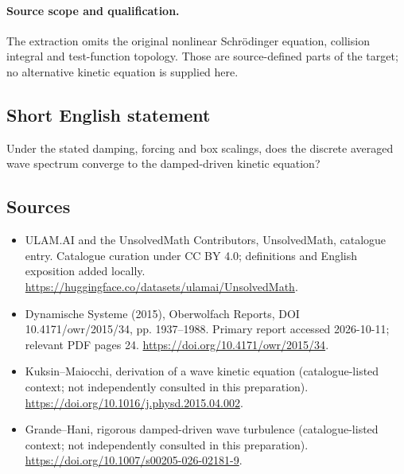 \documentclass[11pt]{article}
\begin{document}
\paragraph{Source scope and qualification.}
The extraction omits the original nonlinear Schrödinger equation, collision integral and test-function topology. Those are source-defined parts of the target; no alternative kinetic equation is supplied here.
\subsection{Short English statement}
Under the stated damping, forcing and box scalings, does the discrete averaged wave spectrum converge to the damped-driven kinetic equation?
\subsection{Sources}
\begin{itemize}
\item[\hypertarget{source:statement:1}{S1}] ULAM.AI and the UnsolvedMath Contributors, UnsolvedMath, catalogue entry. Catalogue curation under CC BY 4.0; definitions and English exposition added locally.
\url{https://huggingface.co/datasets/ulamai/UnsolvedMath}.
\item[\hypertarget{source:statement:2}{S2}] Dynamische Systeme (2015), Oberwolfach Reports, DOI 10.4171/owr/2015/34, pp. 1937--1988. Primary report accessed 2026-10-11; relevant PDF pages 24.
\url{https://doi.org/10.4171/owr/2015/34}.
\item[\hypertarget{source:statement:3}{S3}] Kuksin--Maiocchi, derivation of a wave kinetic equation (catalogue-listed context; not independently consulted in this preparation).
\url{https://doi.org/10.1016/j.physd.2015.04.002}.
\item[\hypertarget{source:statement:4}{S4}] Grande--Hani, rigorous damped-driven wave turbulence (catalogue-listed context; not independently consulted in this preparation).
\url{https://doi.org/10.1007/s00205-026-02181-9}.
\end{itemize}
\label{end:statement}
\end{document}
